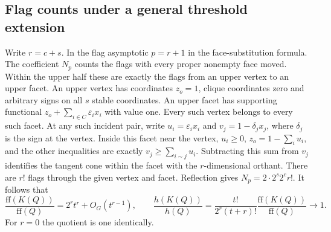 \documentclass[11pt,a4paper]{article}
\numberwithin{equation}{section}
\begin{document}
\subsection{Flag counts under a general threshold extension}
Write $r=c+s$. In the flag asymptotic $p=r+1$ in the face-substitution formula.
The coefficient $N_p$ counts the flags with every proper nonempty
face moved. Within the upper half these are exactly the flags from
an upper vertex to an upper facet. An upper vertex has coordinates
$z_o=1$, clique coordinates zero and arbitrary signs on all $s$ stable
coordinates. An upper facet has supporting functional
$z_o+\sum_{i\in C}\varepsilon_i x_i$ with value one. Every such vertex
belongs to every such facet. At any such incident pair, write
$u_i=\varepsilon_i x_i$ and $v_j=1-\delta_j x_j$, where
$\delta_j$ is the sign at the vertex. Inside this facet near the vertex,
$u_i\ge0$, $z_o=1-\sum_i u_i$, and the other inequalities are exactly
$v_j\ge\sum_{i\sim j}u_i$. Subtracting this sum from $v_j$ identifies
the tangent cone within the facet with the $r$-dimensional orthant.
There are $r!$ flags through the given vertex and facet. Reflection gives
$N_p=2\cdot 2^s 2^c r!$. It follows that
\[
 \frac{\mathrm{ff}(K(Q))}{\mathrm{ff}(Q)}
       = 2^r t^r+O_G(t^{r-1}),
 \qquad
 \frac{h(K(Q))}{h(Q)}
       = \frac{t!}{2^r(t+r)!}
           \frac{\mathrm{ff}(K(Q))}{\mathrm{ff}(Q)}\longrightarrow1.
\]
For $r=0$ the quotient is one identically.
\end{document}
